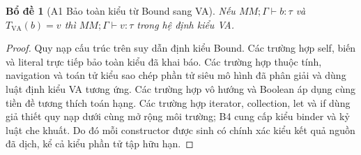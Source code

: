 \documentclass[11pt,a4paper]{article}
\newtheorem{lemma}{Bổ đề}
\theoremstyle{definition}
\begin{document}
\begin{lemma}[A1 Bảo toàn kiểu từ Bound sang VA]
Nếu $MM;\Gamma\vdash b:\tau$ và $T_{\mathrm{VA}}(b)=v$ thì
$MM;\Gamma\vdash v:\tau$ trong hệ định kiểu VA.
\end{lemma}
\begin{proof}
Quy nạp cấu trúc trên suy dẫn định kiểu Bound. Các trường hợp self, biến và
literal trực tiếp bảo toàn kiểu đã khai báo. Các trường hợp thuộc tính,
navigation và toán tử kiểu sao chép phần tử siêu mô hình đã phân giải và dùng
luật định kiểu VA tương ứng. Các trường hợp vô hướng và Boolean áp dụng cùng
tiền đề tương thích toán hạng. Các trường hợp iterator, collection, let và if
dùng giả thiết quy nạp dưới cùng mở rộng môi trường; B4 cung cấp kiểu binder và
kỷ luật che khuất. Do đó mỗi constructor được sinh có chính xác kiểu kết quả
nguồn đã dịch, kể cả kiểu phần tử tập hữu hạn.
\end{proof}
\end{document}
